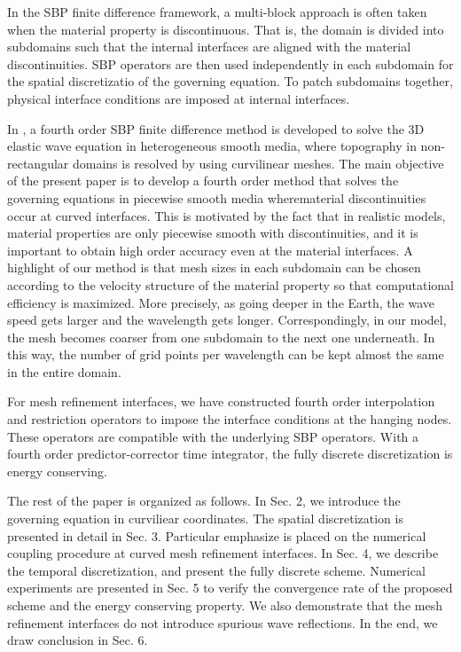 In the SBP finite difference framework, a multi-block approach is often taken when the material property is discontinuous. That is, the domain is divided into subdomains such that the internal interfaces are aligned with the material discontinuities. SBP operators are then used independently in each subdomain for the spatial discretizatio of the governing equation. To patch subdomains together, physical interface conditions are imposed at internal interfaces. 



In \cite{petersson2015wave}, a fourth order SBP finite difference method is developed to solve the 3D elastic wave equation in heterogeneous smooth media, where topography in non-rectangular domains is resolved by using curvilinear meshes. The main objective of the present paper is to develop a fourth order method that solves the governing equations in piecewise smooth media wherematerial discontinuities occur at curved interfaces. This is motivated by the fact that in realistic models, material properties are only piecewise smooth with discontinuities, and it is important to obtain high order accuracy even at the material interfaces. A highlight of our method is that  mesh sizes in each subdomain can be chosen according to the velocity structure of the material property so that computational efficiency is maximized. More precisely, as going deeper in the Earth, the wave speed gets larger and the wavelength gets longer. Correspondingly, in our model, the mesh becomes coarser from one subdomain to the next one underneath. In this way, the number of grid points per wavelength can be kept almost the same in the entire domain. 

For mesh refinement interfaces, we have constructed fourth order interpolation and restriction operators to impose the interface conditions at the hanging nodes. These operators are compatible with the underlying SBP operators. With a fourth order predictor-corrector time integrator, the fully discrete discretization is energy conserving. 

The rest of the paper is organized as follows. In Sec. 2, we introduce the governing equation in curviliear coordinates. The spatial discretization is presented in detail in Sec. 3. Particular emphasize is placed on the numerical coupling procedure at curved mesh refinement interfaces. In Sec. 4, we describe the temporal discretization, and present the fully discrete scheme. Numerical experiments are presented in Sec. 5 to verify the convergence rate of the proposed scheme and the energy conserving property. We also demonstrate that the mesh refinement interfaces do not introduce spurious wave reflections. In the end, we draw conclusion in Sec. 6. 
